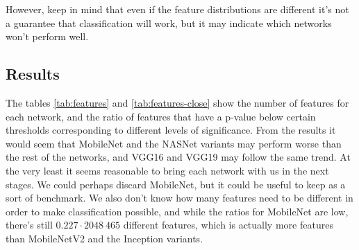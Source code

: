 \documentclass[12pt, notitlepage]{article}
\begin{document}
However, keep in mind that even if the feature distributions are different it's not a guarantee that 
classification will work, but it may indicate which networks won't perform well.
\subsection{Results}
The tables \ref{tab:features} and \ref{tab:features-close} show the number of features for each network,
and the ratio of features that have a p-value below certain thresholds corresponding to different levels
of significance. From the results it would seem that MobileNet and the NASNet variants may perform worse
than the rest of the networks, and VGG16 and VGG19 may follow the same trend. At the very least it seems
reasonable to bring each network with us in the next stages. We could perhaps discard MobileNet, but it
could be useful to keep as a sort of benchmark. We also don't know how many features need to be different
in order to make classification possible, and while the ratios for MobileNet are low, there's still
$0.227\cdot 2048 ~ 465$ different features, which is actually more features than MobileNetV2 and the Inception 
variants.
\end{document}

